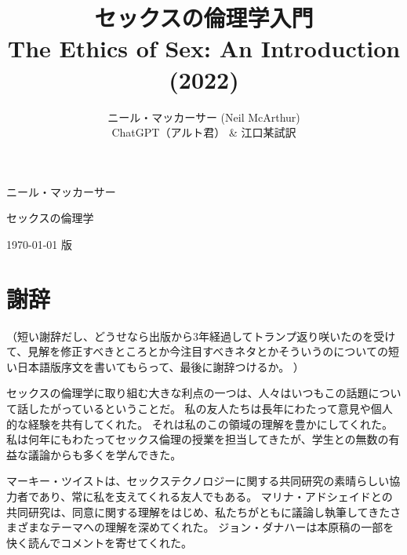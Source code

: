 \documentclass[paper=a4,book,openany]{jlreq}
\title{セックスの倫理学入門 \\ The Ethics of Sex: An Introduction (2022)}
\author{ニール・マッカーサー (Neil McArthur) \\ ChatGPT（アルト君） \& 江口某試訳}
\begin{document}
\frontmatter
{}
\begin{center}
\vspace{3\zw}

{\Huge ニール・マッカーサー}

\vspace{1\zw}

{\Huge セックスの倫理学}

   \end{center}

  \begin{center}
  \today\hspace{1\zw} \DTMcurrenttime 版
  \end{center}


\tableofcontents
{}
\chapter*{謝辞}

（短い謝辞だし、どうせなら出版から3年経過してトランプ返り咲いたのを受けて、見解を修正すべきところとか今注目すべきネタとかそういうのについての短い日本語版序文を書いてもらって、最後に謝辞つけるか。
）

\vspace{2\zw}
セックスの倫理学に取り組む大きな利点の一つは、人々はいつもこの話題について話したがっているということだ。
私の友人たちは長年にわたって意見や個人的な経験を共有してくれた。
それは私のこの領域の理解を豊かにしてくれた。
私は何年にもわたってセックス倫理の授業を担当してきたが、学生との無数の有益な議論からも多くを学んできた。

マーキー・ツイストは、セックステクノロジーに関する共同研究の素晴らしい協力者であり、常に私を支えてくれる友人でもある。
マリナ・アドシェイドとの共同研究は、同意に関する理解をはじめ、私たちがともに議論し執筆してきたさまざまなテーマへの理解を深めてくれた。
ジョン・ダナハーは本原稿の一部を快く読んでコメントを寄せてくれた。
\end{document}
